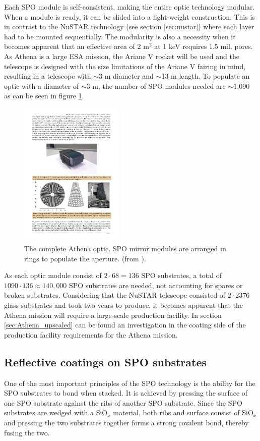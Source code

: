 Each SPO module is self-consistent, making the entire optic technology modular. When a module is ready, it can be slided into a light-weight construction. This is in contrast to the NuSTAR technology (see section \ref{sec:nustar}) where each layer had to be mounted sequentially. The modularity is also a necessity when it becomes apparent that an effective area of 2 m$^2$ at 1 keV requires 1.5 mil. pores. As Athena is a large ESA mission, the Ariane V rocket will be used and the telescope is designed with the size limitations of the Ariane V fairing in mind, resulting in a telescope with $\sim$3 m diameter and $\sim$13 m length. To populate an optic with a diameter of $\sim$3 m, the number of SPO modules needed are $\sim$1,090 as can be seen in figure \ref{fig:Athena_full_optic}.

\begin{figure}[!h]
  \center
  \includegraphics[height=7cm]{figures/athena/athena_full_optic.pdf}
\caption{\footnotesize The complete Athena optic. SPO mirror modules are arranged in rings to populate the aperture. (from \cite{Willingale:2013vo}).}\label{fig:Athena_full_optic}
\end{figure}

As each optic module consist of $2 \cdot 68 = 136$ SPO substrates, a total of $1090 \cdot 136 \approx 140,000$ SPO substrates are needed, not accounting for spares or broken substrates. Considering that the NuSTAR telescope consisted of $2\cdot2376$ glass substrates and took two years to produce, it becomes apparent that the Athena mission will require a large-scale production facility. In section \ref{sec:Athena_upscaled} can be found an investigation in the coating side of the production facility requirements for the Athena mission.

\subsection{Reflective coatings on SPO substrates}\label{sec:litho_process}
One of the most important principles of the SPO technology is the ability for the SPO substrates to bond when stacked. It is achieved by pressing the surface of one SPO substrate against the ribs of another SPO substrate. Since the SPO substrates are wedged with a SiO$_x$ material, both ribs and surface consist of SiO$_x$ and pressing the two substrates together forms a strong covalent bond, thereby fusing the two.

